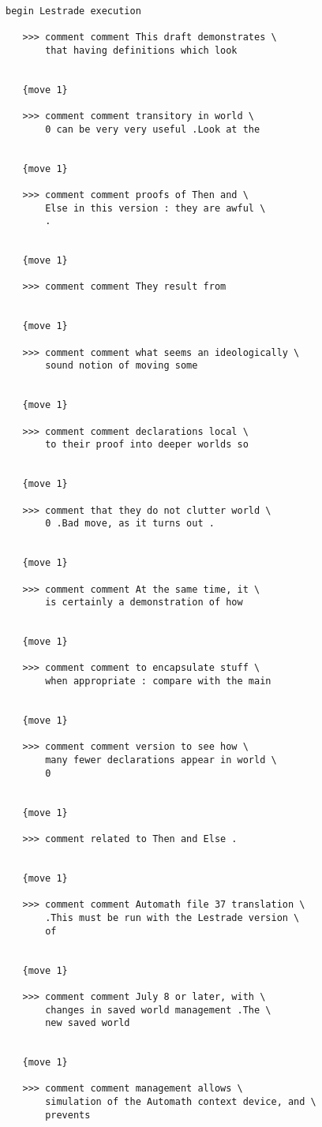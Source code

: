 \documentclass{article}
\begin{document}
\begin{verbatim}

begin Lestrade execution

   >>> comment comment This draft demonstrates \
       that having definitions which look


   {move 1}

   >>> comment comment transitory in world \
       0 can be very very useful .Look at the


   {move 1}

   >>> comment comment proofs of Then and \
       Else in this version : they are awful \
       .


   {move 1}

   >>> comment comment They result from


   {move 1}

   >>> comment comment what seems an ideologically \
       sound notion of moving some


   {move 1}

   >>> comment comment declarations local \
       to their proof into deeper worlds so


   {move 1}

   >>> comment that they do not clutter world \
       0 .Bad move, as it turns out .


   {move 1}

   >>> comment comment At the same time, it \
       is certainly a demonstration of how


   {move 1}

   >>> comment comment to encapsulate stuff \
       when appropriate : compare with the main


   {move 1}

   >>> comment comment version to see how \
       many fewer declarations appear in world \
       0


   {move 1}

   >>> comment related to Then and Else .


   {move 1}

   >>> comment comment Automath file 37 translation \
       .This must be run with the Lestrade version \
       of


   {move 1}

   >>> comment comment July 8 or later, with \
       changes in saved world management .The \
       new saved world


   {move 1}

   >>> comment comment management allows \
       simulation of the Automath context device, and \
       prevents



\end{verbatim}
\end{document}
